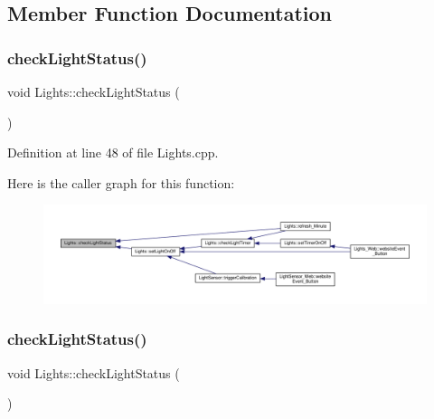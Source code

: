 \subsection{Member Function Documentation}
\mbox{\label{class_lights_a358764e84694051f14f8cdc89dab44ee}} 
\subsubsection{\texorpdfstring{check\+Light\+Status()}{checkLightStatus()}\hspace{0.1cm}{\footnotesize\ttfamily [1/2]}}
{\footnotesize\ttfamily void Lights\+::check\+Light\+Status (\begin{DoxyParamCaption}{ }\end{DoxyParamCaption})\hspace{0.3cm}{\ttfamily [protected]}}



Definition at line 48 of file Lights.\+cpp.

Here is the caller graph for this function\+:
\nopagebreak
\begin{figure}[H]
\begin{center}
\leavevmode
\includegraphics[width=350pt]{class_lights_a358764e84694051f14f8cdc89dab44ee_icgraph}
\end{center}
\end{figure}
\mbox{\label{class_lights_a358764e84694051f14f8cdc89dab44ee}} 
\subsubsection{\texorpdfstring{check\+Light\+Status()}{checkLightStatus()}\hspace{0.1cm}{\footnotesize\ttfamily [2/2]}}
{\footnotesize\ttfamily void Lights\+::check\+Light\+Status (\begin{DoxyParamCaption}{ }\end{DoxyParamCaption})\hspace{0.3cm}{\ttfamily [protected]}}

